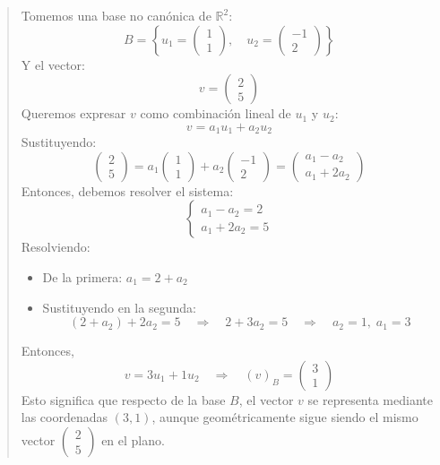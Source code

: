 \begin{quote}
  Tomemos una base no canónica de \(\mathbb{R}^2\):
  \[
  B = \left\{ u_1 = \begin{pmatrix} 1 \\ 1 \end{pmatrix}, \quad
  u_2 = \begin{pmatrix} -1 \\ 2 \end{pmatrix} \right\}
  \]
  Y el vector:
  \[
  v = \begin{pmatrix} 2 \\ 5 \end{pmatrix}
  \]
  Queremos expresar \(v\) como combinación lineal de \(u_1\) y \(u_2\):
  \[
  v = a_1 u_1 + a_2 u_2
  \]
  Sustituyendo:
  \[
  \begin{pmatrix} 2 \\ 5 \end{pmatrix}
  =
  a_1 \begin{pmatrix} 1 \\ 1 \end{pmatrix}
  + a_2 \begin{pmatrix} -1 \\ 2 \end{pmatrix}
  =
  \begin{pmatrix} a_1 - a_2 \\ a_1 + 2a_2 \end{pmatrix}
  \]
  Entonces, debemos resolver el sistema:
  \[
  \begin{cases}
  a_1 - a_2 = 2 \\
  a_1 + 2a_2 = 5
  \end{cases}
  \]
  Resolviendo:
  \begin{itemize}
    \item De la primera: \(a_1 = 2 + a_2\)
    \item Sustituyendo en la segunda:
    \[
    (2 + a_2) + 2a_2 = 5 \quad\Rightarrow\quad 2 + 3a_2 = 5 \quad\Rightarrow\quad a_2 = 1,\; a_1 = 3
    \]
  \end{itemize}
  Entonces,
  \[
  v = 3u_1 + 1u_2
  \quad\Longrightarrow\quad
  (v)_B = \begin{pmatrix} 3 \\ 1 \end{pmatrix}
  \]
  Esto significa que respecto de la base \(B\), el vector \(v\) se representa mediante las coordenadas \((3, 1)\), aunque geométricamente sigue siendo el mismo vector \(\begin{pmatrix} 2 \\ 5 \end{pmatrix}\) en el plano.
\end{quote}

